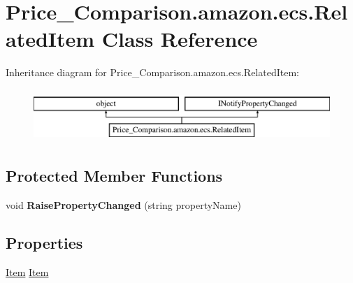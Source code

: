 \hypertarget{class_price___comparison_1_1amazon_1_1ecs_1_1_related_item}{\section{Price\-\_\-\-Comparison.\-amazon.\-ecs.\-Related\-Item Class Reference}
\label{class_price___comparison_1_1amazon_1_1ecs_1_1_related_item}
}


 


Inheritance diagram for Price\-\_\-\-Comparison.\-amazon.\-ecs.\-Related\-Item\-:\begin{figure}[H]
\begin{center}
\leavevmode
\includegraphics[height=2.000000cm]{class_price___comparison_1_1amazon_1_1ecs_1_1_related_item}
\end{center}
\end{figure}
\subsection*{Protected Member Functions}
\begin{DoxyCompactItemize}
\item 
\hypertarget{class_price___comparison_1_1amazon_1_1ecs_1_1_related_item_abafd38c18e7b231e99fa66292ab95a37}{void {\bfseries Raise\-Property\-Changed} (string property\-Name)}\label{class_price___comparison_1_1amazon_1_1ecs_1_1_related_item_abafd38c18e7b231e99fa66292ab95a37}

\end{DoxyCompactItemize}
\subsection*{Properties}
\begin{DoxyCompactItemize}
\item 
\hypertarget{class_price___comparison_1_1amazon_1_1ecs_1_1_related_item_a8d7c919bfaa125fb00ecbaf128aead6c}{\hyperlink{class_price___comparison_1_1amazon_1_1ecs_1_1_item}{Item} \hyperlink{class_price___comparison_1_1amazon_1_1ecs_1_1_related_item_a8d7c919bfaa125fb00ecbaf128aead6c}{Item}}\label{class_price___comparison_1_1amazon_1_1ecs_1_1_related_item_a8d7c919bfaa125fb00ecbaf128aead6c}

\begin{DoxyCompactList}\small\item\em \end{DoxyCompactList}\end{DoxyCompactItemize}
